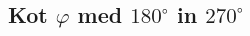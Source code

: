         


        
            \subsection*{Kot $\varphi$ med $180^\circ$ in $270^\circ$}
            
            
                \begin{multicols}{2}
                
                    \begin{figure}[H]
                        \centering
                            
                            

\end{figure}
\end{multicols}
